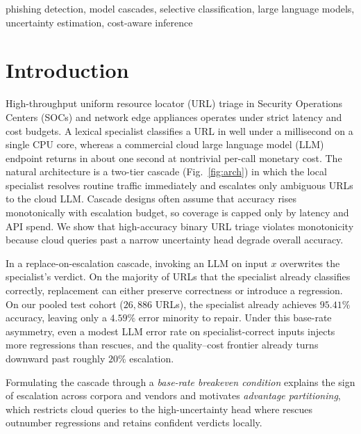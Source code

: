 \documentclass[conference,a4paper]{IEEEtran}
\begin{document}
\begin{IEEEkeywords}
phishing detection, model cascades, selective classification, large language
models, uncertainty estimation, cost-aware inference
\end{IEEEkeywords}

\section{Introduction}
High-throughput uniform resource locator (URL) triage in Security Operations Centers
(SOCs) and network edge appliances operates under strict latency and cost budgets. A
lexical specialist classifies a URL in well under a millisecond on a single CPU core,
whereas a commercial cloud large language model (LLM) endpoint returns in about one
second at nontrivial per-call monetary cost. The natural architecture is a two-tier cascade
(Fig.~\ref{fig:arch}) in which the local specialist resolves routine traffic
immediately and escalates only ambiguous URLs to the cloud LLM. Cascade designs
often assume that accuracy rises monotonically with escalation budget, so coverage
is capped only by latency and API spend. We show that high-accuracy binary URL triage
violates monotonicity because cloud queries past a narrow uncertainty head
degrade overall accuracy.

In a replace-on-escalation cascade, invoking an LLM on input $x$ overwrites the
specialist's verdict. On the majority of URLs that the specialist already classifies
correctly, replacement can either preserve correctness or introduce a regression. On
our pooled test cohort ($26{,}886$ URLs), the specialist already achieves $95.41\%$
accuracy, leaving only a $4.59\%$ error minority to repair. Under this base-rate
asymmetry, even a modest LLM error rate on specialist-correct inputs injects more
regressions than rescues, and the quality--cost frontier already turns downward past
roughly $20\%$ escalation.

Formulating the cascade through a \emph{base-rate breakeven condition} explains the
sign of escalation across corpora and vendors and motivates \emph{advantage
partitioning}, which restricts cloud queries to the high-uncertainty head where
rescues outnumber regressions and retains confident verdicts locally.
\end{document}
